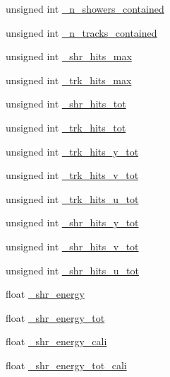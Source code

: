 \begin{DoxyCompactItemize}
\item 
unsigned int \hyperlink{classselection_1_1NuMuSelection_a8583770de84e76b78e7ddfb4b7e733da}{\-\_\-n\-\_\-showers\-\_\-contained}
\item 
unsigned int \hyperlink{classselection_1_1NuMuSelection_a4f7501393a59de50a8547b6ff2f286b8}{\-\_\-n\-\_\-tracks\-\_\-contained}
\item 
unsigned int \hyperlink{classselection_1_1NuMuSelection_ab314b2264e547d258e88d2f773352b9f}{\-\_\-shr\-\_\-hits\-\_\-max}
\item 
unsigned int \hyperlink{classselection_1_1NuMuSelection_a3e0166490638c0d08a3b66de9ed1ec91}{\-\_\-trk\-\_\-hits\-\_\-max}
\item 
unsigned int \hyperlink{classselection_1_1NuMuSelection_a9233cd2b1aa05f66da7c04f99ff99058}{\-\_\-shr\-\_\-hits\-\_\-tot}
\item 
unsigned int \hyperlink{classselection_1_1NuMuSelection_abcc3673c89468d4af37e7936ac5716ea}{\-\_\-trk\-\_\-hits\-\_\-tot}
\item 
unsigned int \hyperlink{classselection_1_1NuMuSelection_a7c0ae4ea16390adf8803846578ad2d05}{\-\_\-trk\-\_\-hits\-\_\-y\-\_\-tot}
\item 
unsigned int \hyperlink{classselection_1_1NuMuSelection_adf551288be333a585b4fe8b111b8d3dc}{\-\_\-trk\-\_\-hits\-\_\-v\-\_\-tot}
\item 
unsigned int \hyperlink{classselection_1_1NuMuSelection_ab9a14b2e6823b5309c44d17e343087c6}{\-\_\-trk\-\_\-hits\-\_\-u\-\_\-tot}
\item 
unsigned int \hyperlink{classselection_1_1NuMuSelection_a2d08099d9037a3bc8b3b5c7de3de4b4f}{\-\_\-shr\-\_\-hits\-\_\-y\-\_\-tot}
\item 
unsigned int \hyperlink{classselection_1_1NuMuSelection_aa2d62d528b55bfbb0964fa68f2d0ff04}{\-\_\-shr\-\_\-hits\-\_\-v\-\_\-tot}
\item 
unsigned int \hyperlink{classselection_1_1NuMuSelection_aa88c0578a68ec301fecbe3262aa44762}{\-\_\-shr\-\_\-hits\-\_\-u\-\_\-tot}
\item 
float \hyperlink{classselection_1_1NuMuSelection_a06ebfacd01494668815b794a793e58cf}{\-\_\-shr\-\_\-energy}
\item 
float \hyperlink{classselection_1_1NuMuSelection_a73da6cca89a0a1a854297f4d0a2ac851}{\-\_\-shr\-\_\-energy\-\_\-tot}
\item 
float \hyperlink{classselection_1_1NuMuSelection_a902fba92b860066bac4ba35e1e014891}{\-\_\-shr\-\_\-energy\-\_\-cali}
\item 
float \hyperlink{classselection_1_1NuMuSelection_a1401935e64b23d52ece082c731c87624}{\-\_\-shr\-\_\-energy\-\_\-tot\-\_\-cali}

\end{DoxyCompactItemize}

